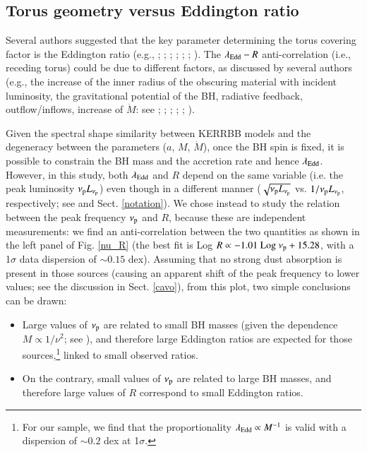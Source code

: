 \documentclass[]{aa}
\begin{document}

\subsection{Torus geometry versus Eddington ratio}

Several authors suggested that the key parameter determining the torus covering factor is the Eddington ratio (e.g., \citealt{Law}; \citealt{Ueda}; \citealt{Treister}; \citealt{Burlon}; \citealt{Ezhi}; \citealt{Buch}; \citealt{Ricci}). The $\lambda_{\rm Edd} - R$ anti-correlation (i.e., receding torus) could be due to different factors, as discussed by several authors (e.g., the increase of the inner radius of the obscuring material with incident luminosity, the gravitational potential of the BH, radiative feedback, outflow/inflows, increase of $\dot{M}$: see \citealt{Law}; \citealt{Lama}; \citealt{Menci}; \citealt{Fabianetal09}; \citealt{Wada}; \citealt{Ricci}).

Given the spectral shape similarity between KERRBB models and the degeneracy between the parameters ($a$, $M$, $\dot{M}$), once the BH spin is fixed, it is possible to constrain the BH mass and the accretion rate and hence $\lambda_{\rm Edd}$. However, in this study, both $\lambda_{\rm Edd}$ and $R$ depend on the same variable (i.e. the peak luminosity $\nu_{\rm p} L_{\nu_{\rm p}}$) even though in a different manner ($\sqrt{\nu_{\rm p} L_{\nu_{\rm p}}}$ vs. $1/\nu_{\rm p} L_{\nu_{\rm p}}$, respectively; see \citealt{Campitib} and Sect. \ref{notation}). We chose instead to study the relation between the peak frequency $\nu_{\rm p}$ and $R$, because these are independent measurements: we find an anti-correlation between the two quantities as shown in the left panel of Fig. \ref{nu_R} (the best fit is Log $R \propto -1.01\ {\rm Log}\ \nu_{\rm p} + 15.28$, with a 1$\sigma$ data dispersion of $\sim 0.15$ dex). Assuming that no strong dust absorption is present in those sources (causing an apparent shift of the peak frequency to lower values; see the discussion in Sect. \ref{cavo}), from this plot, two simple conclusions can be drawn:
\begin{itemize}
	\item Large values of $\nu_{\rm p}$ are related to small BH masses (given the dependence $M \propto 1/\nu^{2}$; see \citealt{Campiti,Campitib}), and therefore large Eddington ratios are expected for those sources,\footnote{For our sample, we find that the proportionality $\lambda_{\rm Edd} \propto M^{-1}$ is valid with a dispersion of $\sim 0.2$ dex at 1$\sigma$.} linked to small observed ratios.
	\item On the contrary, small values of $\nu_{\rm p}$ are related to large BH masses, and therefore large values of $R$ correspond to small Eddington ratios.
\end{itemize}
\end{document}
